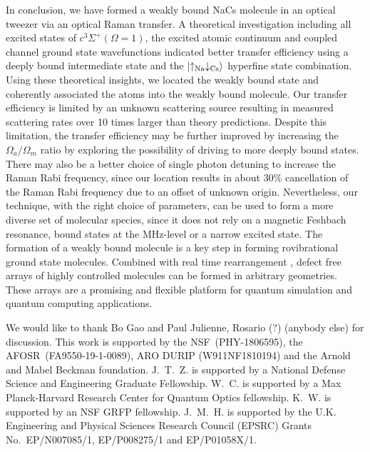 \documentclass[aps,prl,twocolumn,superscriptaddress]{revtex4-1}
\newcommand{\todo}[1]{}
\begin{document}
In conclusion, we have formed a weakly bound NaCs molecule in an optical tweezer via an optical Raman transfer. A theoretical investigation including all excited states of $ c^3\Sigma^+(\Omega = 1)$, the excited atomic continuum and coupled channel ground state wavefunctions indicated better transfer efficiency using a deeply bound intermediate state and the $ \ket{\uparrow_{\text{Na}} \downarrow_{\text{Cs}} } $ hyperfine state combination. Using these theoretical insights, we located the weakly bound state and coherently associated the atoms into the weakly bound molecule. Our transfer efficiency is limited by an unknown scattering source resulting in measured scattering rates over 10 times larger than theory predictions. Despite this limitation, the transfer efficiency may be further improved by increasing the $ \Omega_a/\Omega_m$ ratio by exploring the possibility of driving to more deeply bound states. There may also be a better choice of single photon detuning to increase the Raman Rabi frequency, since our location results in about 30\% cancellation of the Raman Rabi frequency due to an offset of unknown origin. Nevertheless, our technique, with the right choice of parameters, can be used to form a more diverse set of molecular species, since it does not rely on a magnetic Feshbach resonance, bound states at the MHz-level or a narrow excited state. The formation of a weakly bound molecule is a key step in forming rovibrational ground state molecules. Combined with real time rearrangement \cite{Barredo2016, Endres2016}, defect free arrays of highly controlled molecules can be formed in arbitrary geometries. These arrays are a promising and flexible platform for quantum simulation and quantum computing applications.

\todo{sm: STIRAP vs Raman}

\begin{acknowledgments}
  We would like to thank Bo Gao and Paul Julienne, Rosario (?) (anybody else) for discussion. This work is supported by the NSF~(PHY-1806595), the AFOSR~(FA9550-19-1-0089), ARO DURIP (W911NF1810194) and the Arnold and Mabel Beckman foundation. J.~T.~Z. is supported by a National Defense Science and Engineering Graduate Fellowship. W.~C. is supported by a Max Planck-Harvard Research Center for Quantum Optics fellowship. K.~W. is supported by an NSF GRFP fellowship. J.~M.~H. is supported by the U.K. Engineering and Physical Sciences Research Council (EPSRC) Grants No.\ EP/N007085/1, EP/P008275/1 and EP/P01058X/1.
\end{acknowledgments}



\end{document}
